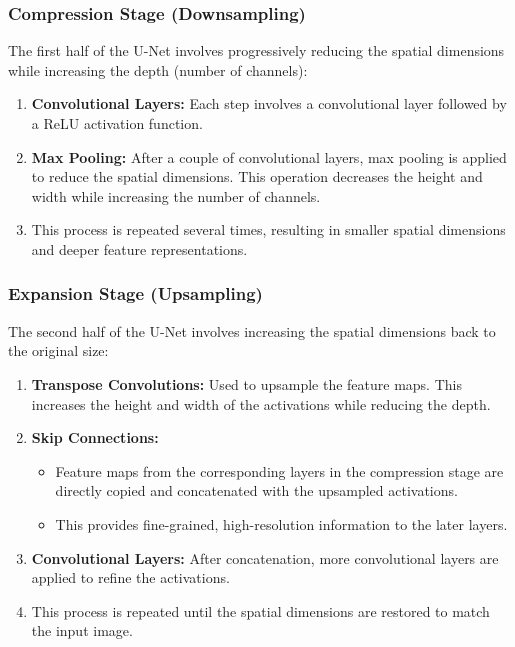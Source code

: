 \documentclass[letterpaper,12pt,notitlepage,twoside]{report}
\begin{document}
\subsubsection*{Compression Stage (Downsampling)}

The first half of the U-Net involves progressively reducing the spatial dimensions while increasing the depth (number of channels):
\begin{enumerate}
    \item \textbf{Convolutional Layers:} Each step involves a convolutional layer followed by a ReLU activation function.
    \item \textbf{Max Pooling:} After a couple of convolutional layers, max pooling is applied to reduce the spatial dimensions. This operation decreases the height and width while increasing the number of channels.
    \item This process is repeated several times, resulting in smaller spatial dimensions and deeper feature representations.
\end{enumerate}

\subsubsection*{Expansion Stage (Upsampling)}

The second half of the U-Net involves increasing the spatial dimensions back to the original size:
\begin{enumerate}
    \item \textbf{Transpose Convolutions:} Used to upsample the feature maps. This increases the height and width of the activations while reducing the depth.
    \item \textbf{Skip Connections:} 
    \begin{itemize}
        \item Feature maps from the corresponding layers in the compression stage are directly copied and concatenated with the upsampled activations.
        \item This provides fine-grained, high-resolution information to the later layers.
    \end{itemize}
    \item \textbf{Convolutional Layers:} After concatenation, more convolutional layers are applied to refine the activations.
    \item This process is repeated until the spatial dimensions are restored to match the input image.
\end{enumerate}
\end{document}
